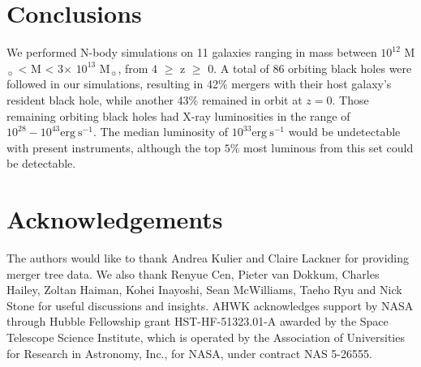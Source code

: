 \documentclass[fleqn,usenatbib,useAMS]{mnras}
\begin{document}
\section{Conclusions}\label{sec:conclusions}
We performed N-body simulations on 11 galaxies ranging in mass between $10^{12}$ M$_{\sun}$ < M < 3$\times$ $10^{13}$ M$_{\sun}$, from 4 $\geq$ z $\geq$ 0.  A total of 86 orbiting black holes were followed in our simulations, resulting in 42$\%$ mergers with their host galaxy's resident black hole, while another 43$\%$ remained in orbit at $z=0$.  Those remaining orbiting black holes had X-ray luminosities in the range of $10^{28}-10^{43}\mathrm{erg}~\mathrm{s}^{-1}$.  The median luminosity of $10^{33}\mathrm{erg}~\mathrm{s}^{-1}$ would be undetectable with present instruments, although the top $5\%$ most luminous from this set could be detectable.

\section{Acknowledgements}
The authors would like to thank Andrea Kulier and Claire Lackner for providing merger tree data. We also thank Renyue Cen, Pieter van Dokkum, Charles Hailey, Zoltan Haiman, Kohei Inayoshi, Sean McWilliams, Taeho Ryu and Nick Stone for useful discussions and insights.  AHWK acknowledges support by NASA through Hubble Fellowship grant HST-HF-51323.01-A awarded by the Space Telescope Science Institute, which is operated by the Association of Universities for Research in Astronomy, Inc., for NASA, under contract NAS 5-26555.








\bsp	%
\label{lastpage}
\end{document}
